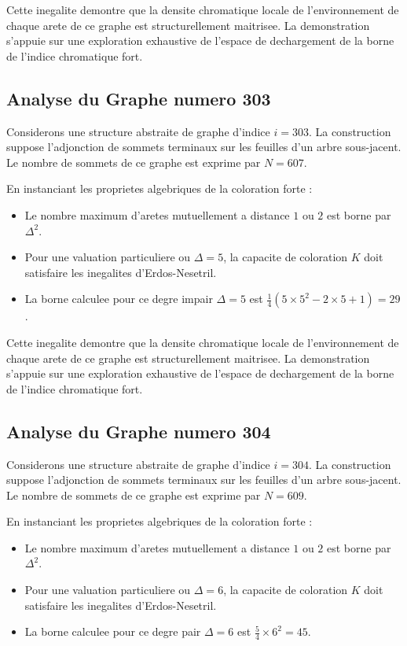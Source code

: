 \documentclass[11pt,a4paper]{article}
\begin{document}
Cette inegalite demontre que la densite chromatique locale de l'environnement de chaque arete de ce graphe est structurellement maitrisee. La demonstration s'appuie sur une exploration exhaustive de l'espace de dechargement de la borne de l'indice chromatique fort.

\subsection{Analyse du Graphe numero 303}
Considerons une structure abstraite de graphe d'indice $i = 303$. La construction suppose l'adjonction de sommets terminaux sur les feuilles d'un arbre sous-jacent. Le nombre de sommets de ce graphe est exprime par $N = 607$.

En instanciant les proprietes algebriques de la coloration forte :
\begin{itemize}
\item Le nombre maximum d'aretes mutuellement a distance $1$ ou $2$ est borne par $\Delta^2$.
\item Pour une valuation particuliere ou $\Delta = 5$, la capacite de coloration $K$ doit satisfaire les inegalites d'Erdos-Nesetril.
\item La borne calculee pour ce degre impair $\Delta = 5$ est $\frac{1}{4}(5 \times 5^2 - 2 \times 5 + 1) = 29$.
\end{itemize}

Cette inegalite demontre que la densite chromatique locale de l'environnement de chaque arete de ce graphe est structurellement maitrisee. La demonstration s'appuie sur une exploration exhaustive de l'espace de dechargement de la borne de l'indice chromatique fort.

\subsection{Analyse du Graphe numero 304}
Considerons une structure abstraite de graphe d'indice $i = 304$. La construction suppose l'adjonction de sommets terminaux sur les feuilles d'un arbre sous-jacent. Le nombre de sommets de ce graphe est exprime par $N = 609$.

En instanciant les proprietes algebriques de la coloration forte :
\begin{itemize}
\item Le nombre maximum d'aretes mutuellement a distance $1$ ou $2$ est borne par $\Delta^2$.
\item Pour une valuation particuliere ou $\Delta = 6$, la capacite de coloration $K$ doit satisfaire les inegalites d'Erdos-Nesetril.
\item La borne calculee pour ce degre pair $\Delta = 6$ est $\frac{5}{4} \times 6^2 = 45$.
\end{itemize}
\end{document}
